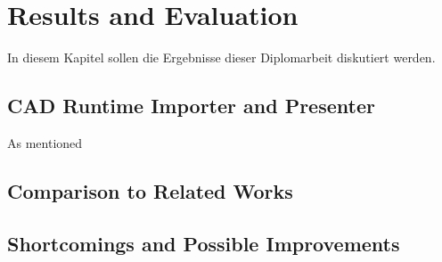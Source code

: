 \chapter{Results and Evaluation}\label{chp:Results}
In diesem Kapitel sollen die Ergebnisse dieser Diplomarbeit diskutiert werden. 
\section{CAD Runtime Importer and Presenter}

As mentioned 
\section{Comparison to Related Works}

\section{Shortcomings and Possible Improvements}